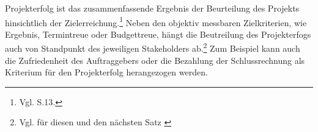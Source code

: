 Projekterfolg ist das zusammenfassende Ergebnis der Beurteilung des Projekts hinsichtlich der Zielerreichung.\footnote{Vgl. \cite{DIN.200901} S.13.}
Neben den objektiv messbaren Zielkriterien, wie Ergebnis, Termintreue oder Budgettreue, hängt die Beutreilung des Projekterfogs auch von Standpunkt des jeweiligen Stakeholders ab.\footnote{Vgl. für diesen und den nächsten Satz \cite{Angermeier.o.J.}}
Zum Beispiel kann auch die Zufriedenheit des Auftraggebers oder die Bezahlung der Schlussrechnung als Kriterium für den Projekterfolg herangezogen werden. 